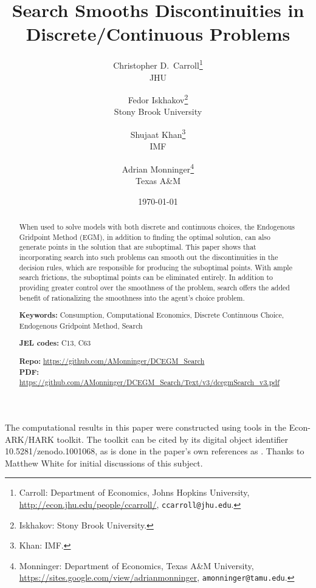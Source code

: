 \title{Search Smooths Discontinuities in\\ Discrete/Continuous Problems}

\author{
Christopher D.\ Carroll\thanks{Carroll: Department of Economics, Johns Hopkins University,
\url{http://econ.jhu.edu/people/ccarroll/}, \texttt{ccarroll@jhu.edu}.}\\
JHU
\and
Fedor Iskhakov\thanks{Iskhakov: Stony Brook University.}\\
Stony Brook University
\and
Shujaat Khan\thanks{Khan: IMF.}\\
IMF
\and
Adrian Monninger\thanks{Monninger: Department of Economics, Texas A\&M University, \url{https://sites.google.com/view/adrianmonninger}, \texttt{amonninger@tamu.edu}.}\\
Texas A\&M
}

\date{\today}

\maketitle

\begin{abstract}
When used to solve models with both discrete and continuous choices, the Endogenous Gridpoint Method (EGM), in addition to finding the optimal solution, can also generate points in the solution that are suboptimal. This paper shows that incorporating search into such problems can smooth out the discontinuities in the decision rules, which are responsible for producing the suboptimal points. With ample search frictions, the suboptimal points can be eliminated entirely. In addition to providing greater control over the smoothness of the problem, search offers the added benefit of rationalizing the smoothness into the agent's choice problem.

\medskip
\noindent\textbf{Keywords:} Consumption, Computational Economics, Discrete Continuous Choice, Endogenous Gridpoint Method, Search

\noindent\textbf{JEL codes:} C13, C63

\medskip
\noindent\textbf{Repo:} \url{https://github.com/AMonninger/DCEGM_Search}\\
\noindent\textbf{PDF:} \url{https://github.com/AMonninger/DCEGM_Search/Text/v3/dcegmSearch_v3.pdf}
\end{abstract}

\bigskip
\noindent\footnotesize The computational results in this paper were constructed using tools in the Econ-ARK/HARK toolkit. The toolkit can be cited by its digital object identifier 10.5281/zenodo.1001068, as is done in the paper's own references as \citet{Carroll2017-hk}.
Thanks to Matthew White for initial discussions of this subject.
\normalsize
